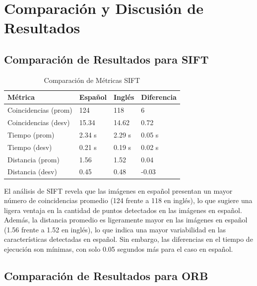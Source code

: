 \documentclass[unnumsec,webpdf,modern,large]{mam-authoring-template}
\theoremstyle{thmstyleone}%
\theoremstyle{thmstyletwo}%
\theoremstyle{thmstylethree}%
\begin{document}
\section{Comparación y Discusión de Resultados}

\subsection{Comparación de Resultados para SIFT}

\begin{table}[h!]
    \centering
    \caption{Comparación de Métricas SIFT}
    \begin{tabular}{ | m{5.5em} | m{1.5cm} | m{1.5cm} | m{1.5cm} | }
        \hline
        \textbf{Métrica} & \textbf{Español} & \textbf{Inglés} & \textbf{Diferencia} \\ 
        \hline
        Coincidencias (prom) & 124 & 118 & 6 \\ 
        \hline
        Coincidencias (desv) & 15.34 & 14.62 & 0.72 \\ 
        \hline
        Tiempo (prom) & 2.34 s & 2.29 s & 0.05 s \\ 
        \hline
        Tiempo (desv) & 0.21 s & 0.19 s & 0.02 s \\ 
        \hline
        Distancia (prom) & 1.56 & 1.52 & 0.04 \\ 
        \hline
        Distancia (desv) & 0.45 & 0.48 & -0.03 \\ 
        \hline
    \end{tabular}
    \label{tab:comparacion_sift}
\end{table}

El análisis de SIFT revela que las imágenes en español presentan un mayor número de coincidencias promedio (124 frente a 118 en inglés), lo que sugiere una ligera ventaja en la cantidad de puntos detectados en las imágenes en español. Además, la distancia promedio es ligeramente mayor en las imágenes en español (1.56 frente a 1.52 en inglés), lo que indica una mayor variabilidad en las características detectadas en español. Sin embargo, las diferencias en el tiempo de ejecución son mínimas, con solo 0.05 segundos más para el caso en español.

\subsection{Comparación de Resultados para ORB}
\end{document}
